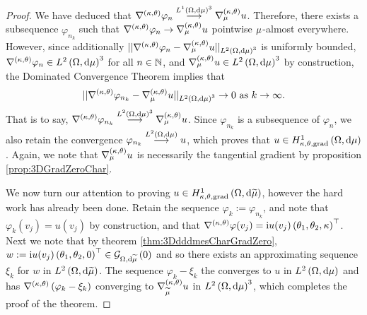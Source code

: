 \begin{proof}
	We have deduced that $\ktgrad\varphi_n\lconv{L^1\bracs{\ddom,\md\ddmes}^3}\ktgrad_{\ddmes}u$.
	Therefore, there exists a subsequence $\varphi_{n_k}$ such that $\ktgrad\varphi_n\rightarrow\ktgrad_{\ddmes}u$ pointwise $\ddmes$-almost everywhere.
	However, since additionally $\norm{\ktgrad\varphi_n-\ktgrad_{\ddmes}u}_{\ltwo{\ddom}{\ddmes}^3}$ is uniformly bounded, $\ktgrad\varphi_n\in\ltwo{\ddom}{\ddmes}^3$ for all $n\in\naturals$, and $\ktgrad_{\ddmes}u\in\ltwo{\ddom}{\ddmes}^3$ by construction, the Dominated Convergence Theorem implies that
	\begin{align*}
		\norm{\ktgrad\varphi_{n_k}-\ktgrad_{\ddmes}u}_{\ltwo{\ddom}{\ddmes}^3} \rightarrow 0 \toInfty{k}.
	\end{align*}
	That is to say, $\ktgrad\varphi_{n_k}\lconv{\ltwo{\ddom}{\ddmes}^3}\ktgrad_{\ddmes}u$.
	Since $\varphi_{n_k}$ is a subsequence of $\varphi_n$, we also retain the convergence $\varphi_{n_k}\lconv{\ltwo{\ddom}{\ddmes}}u$, which proves that $u\in\ktgradSob{\ddom}{\ddmes}$.
	Again, we note that $\ktgrad_{\ddmes}u$ is necessarily the tangential gradient by proposition \ref{prop:3DGradZeroChar}.
	
	We now turn our attention to proving $u\in\ktgradSob{\ddom}{\dddmes}$, however the hard work has already been done.
	Retain the sequence $\varphi_k := \varphi_{n_k}$, and note that $\varphi_k(v_j) = u(v_j)$ by construction, and that $\ktgrad\varphi(v_j) = \rmi u(v_j)\bracs{\qm_1,\qm_2,\wavenumber}^\top$.
	Next we note that by theorem \ref{thm:3DdddmesCharGradZero}, $w := \rmi u(v_j)\bracs{\qm_1,\qm_2,0}^\top\in\gradZero{\ddom}{\dddmes}$ and so there exists an approximating sequence $\xi_k$ for $w$ in $\ltwo{\ddom}{\dddmes}$.
	The sequence $\varphi_k - \xi_k$ the converges to $u$ in $\ltwo{\ddom}{\ddmes}$ and has $\ktgrad\bracs{\varphi_k - \xi_k}$ converging to $\ktgrad_{\dddmes}u$ in $\ltwo{\ddom}{\ddmes}^3$, which completes the proof of the theorem.
\end{proof}

